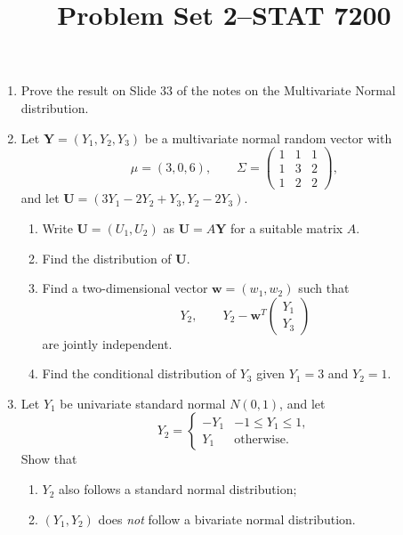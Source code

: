 \documentclass[12pt]{paper}
\title{	
Problem Set 2--STAT 7200
}
\author{} %
\date{} %
\numberwithin{equation}{section} %
\numberwithin{figure}{section} %
\numberwithin{table}{section} %
\begin{document}
\maketitle %


\begin{enumerate}
\item Prove the result on Slide 33 of the notes on the Multivariate Normal distribution.

\vspace{1.5cm}\item Let $\mathbf{Y} = (Y_1, Y_2, Y_3)$ be a multivariate normal random vector with
$$ \mu = (3, 0, 6),\qquad \Sigma = \begin{pmatrix} 1&1&1\\1&3&2\\1&2&2\end{pmatrix},$$
and let $\mathbf{U} = (3Y_1 - 2Y_2 + Y_3, Y_2 - 2Y_3)$.
\begin{enumerate}
  \item Write $\mathbf{U} = (U_1, U_2)$ as $\mathbf{U} = A\mathbf{Y}$ for a suitable matrix $A$.
  \item Find the distribution of $\mathbf{U}$.
  \item Find a two-dimensional vector $\mathbf{w}=(w_1, w_2)$ such that 
  $$ Y_2, \qquad Y_2 - \mathbf{w}^T\begin{pmatrix}Y_1\\Y_3\end{pmatrix}$$
  are jointly independent.
  \item Find the conditional distribution of $Y_3$ given $Y_1=3$ and $Y_2=1$.
\end{enumerate}

\vspace{1.5cm}\item Let $Y_1$ be univariate standard normal $N(0, 1)$, and let
$$ Y_2 = \begin{cases} -Y_1 & -1 \leq Y_1 \leq 1,\\ Y_1 & \mbox{otherwise.}\end{cases}$$
Show that
\begin{enumerate}
\item $Y_2$ also follows a standard normal distribution;
\item $(Y_1, Y_2)$ does \emph{not} follow a bivariate normal distribution.
\end{enumerate}


\end{enumerate}
\end{document}

